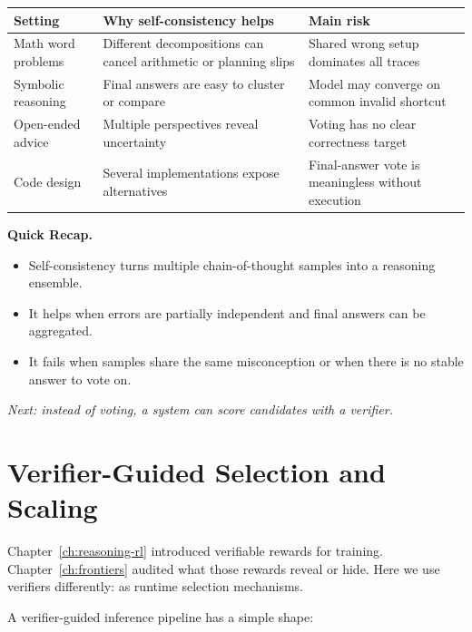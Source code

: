 \begin{center}
\small
\begin{tabularx}{\textwidth}{@{}p{3cm}p{4.5cm}X@{}}
\toprule
\textbf{Setting} & \textbf{Why self-consistency helps} & \textbf{Main risk} \\
\midrule
Math word problems & Different decompositions can cancel arithmetic or planning slips & Shared wrong setup dominates all traces \\
Symbolic reasoning & Final answers are easy to cluster or compare & Model may converge on common invalid shortcut \\
Open-ended advice & Multiple perspectives reveal uncertainty & Voting has no clear correctness target \\
Code design & Several implementations expose alternatives & Final-answer vote is meaningless without execution \\
\bottomrule
\end{tabularx}
\normalsize
\end{center}

\begin{quickrecap}
\textbf{Quick Recap.}
\begin{itemize}[nosep,leftmargin=1.5em]
  \item Self-consistency turns multiple chain-of-thought samples into a reasoning ensemble.
  \item It helps when errors are partially independent and final answers can be aggregated.
  \item It fails when samples share the same misconception or when there is no stable answer to vote on.
\end{itemize}
\textit{Next: instead of voting, a system can score candidates with a verifier.}
\end{quickrecap}


\section{Verifier-Guided Selection and Scaling}
\label{sec:ch18-verifier-selection}

Chapter~\ref{ch:reasoning-rl} introduced verifiable rewards for training. Chapter~\ref{ch:frontiers} audited what those rewards reveal or hide. Here we use verifiers differently: as runtime selection mechanisms.

A verifier-guided inference pipeline has a simple shape:


